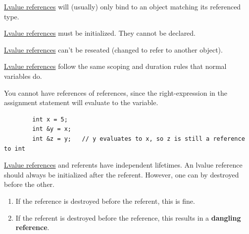 \documentclass{article}
\begin{document}
    \begin{lemma}[Typechecking]
      \label{thm:typechecking}
      \hyperref[def:lvalue-reference]{Lvalue references} will (usually) only bind to an object matching its referenced type. 
    \end{lemma}

    \begin{lemma}[Initialization]
      \label{thm:initialization}
      \hyperref[def:lvalue-reference]{Lvalue references} must be initialized. They cannot be declared. 
    \end{lemma}

    \begin{lemma}[No Reseating]
      \label{thm:no-reseating}
      \hyperref[def:lvalue-reference]{Lvalue references} can't be reseated (changed to refer to another object). 
    \end{lemma}

    \begin{lemma}
      \label{thm:scope-and-duration}
      \hyperref[def:lvalue-reference]{Lvalue references} follow the same scoping and duration rules that normal variables do. 
    \end{lemma} 

    \begin{lemma}
      \label{thm:references-of-references}
      You cannot have references of references, since the right-expression in the assignment statement will evaluate to the variable. 
      \begin{lstlisting}
        int x = 5; 
        int &y = x; 
        int &z = y;   // y evaluates to x, so z is still a reference to int
      \end{lstlisting}
    \end{lemma}

    \begin{lemma}
      \label{thm:dangling-references}
 
      \hyperref[def:lvalue-reference]{Lvalue references} and referents have independent lifetimes. An lvalue reference should always be initialized after the referent. However, one can by destroyed before the other. 
      \begin{enumerate}
        \item If the reference is destroyed before the referent, this is fine. 
        \item If the referent is destroyed before the reference, this results in a \textbf{dangling reference}. 
      \end{enumerate}
    \end{lemma}
\end{document}
